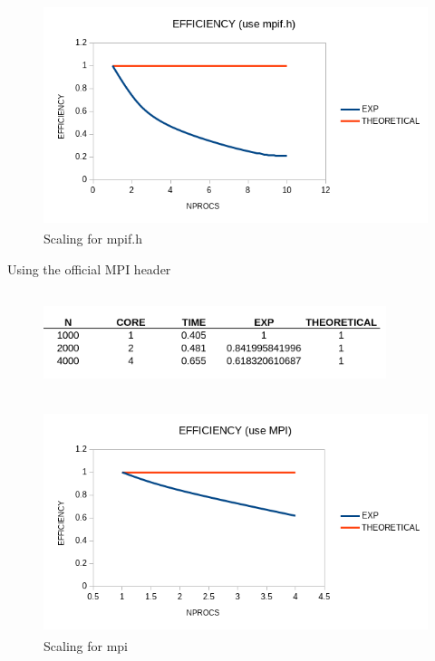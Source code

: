 \documentclass[12pt]{article}
\begin{document}
    \begin{figure}[H]
        \begin{center}
        \hspace*{2.5cm}\includegraphics[height = 65mm,width = 140mm]{scaleBSplot.png}   
        \caption{Scaling for mpif.h}                       
        \end{center}  
    \end{figure}    

    \newpage
    \noindent
    Using the official MPI header
    \begin{figure}[H]
        \begin{center}
        \includegraphics[height = 30mm,width = 100mm]{scaleMPItable.png}             
        \end{center}  
    \end{figure}       


    \begin{figure}[H]
        \begin{center}
        \hspace*{2.5cm}\includegraphics[height = 65mm,width = 140mm]{scaleMPIplot.png}   
        \caption{Scaling for mpi}                       
        \end{center}  
    \end{figure}   
\end{document}
